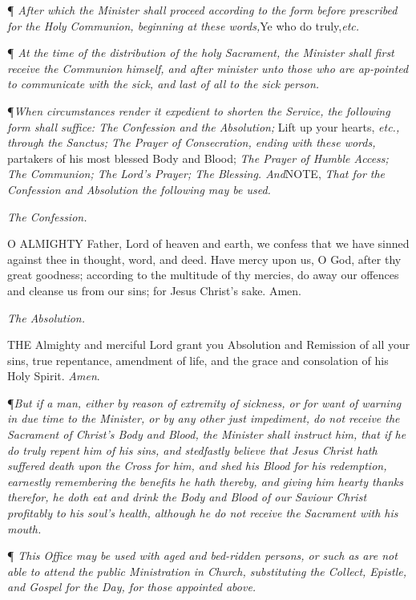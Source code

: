 ¶
\emph{After which the Minister shall proceed according to the form before
prescribed for the Holy Communion, beginning at these words,}Ye
who do truly,\emph{etc.}

¶ \emph{At the time of the distribution of the holy Sacrament, the
Minister shall first receive the Communion himself, and after minister
unto those who are ap-pointed to communicate with the sick, and last
of all to the sick person.}

¶\emph{When circumstances render it expedient to shorten the Service, the following
form shall suffice: The Confession and the Absolution;} Lift up your
hearts, \emph{etc., through the Sanctus; The Prayer of Consecration, ending
with these words,} partakers of his most blessed Body and Blood;
\emph{The Prayer of Humble Access; The Communion; The Lord's Prayer; The
Blessing. And}NOTE, \emph{That for the Confession
and Absolution the following may be used.}

\emph{The
Confession.}

O
ALMIGHTY Father, Lord of heaven and earth, we confess that we have sinned
against thee in thought, word, and deed. Have mercy upon us, O God,
after thy great goodness; according to the multitude of thy mercies,
do away our offences and cleanse us from our sins; for Jesus Christ's
sake. Amen.

\emph{The
Absolution.}

THE
Almighty and merciful Lord grant you Absolution and Remission of all
your sins, true repentance, amendment of life, and the grace and consolation
of his Holy Spirit. \emph{Amen}.

¶\emph{But if a man, either by reason of extremity of sickness, or for want
of warning in due time to the Minister, or by any other just impediment,
do not receive the Sacrament of Christ's Body and Blood, the Minister
shall instruct him, that if he do truly repent him of his sins, and
stedfastly believe that Jesus Christ hath suffered death upon the Cross
for him, and shed his Blood for his redemption, earnestly remembering
the benefits he hath thereby, and giving him hearty thanks therefor,
he doth eat and drink the Body and Blood of our Saviour Christ profitably
to his soul's health, although he do not receive the Sacrament with
his mouth.}

¶ \emph{This Office may be used with aged and bed-ridden persons,
or such as are not able to attend the public Ministration in Church,
substituting the Collect, Epistle, and Gospel for the Day, for those
appointed above.}

